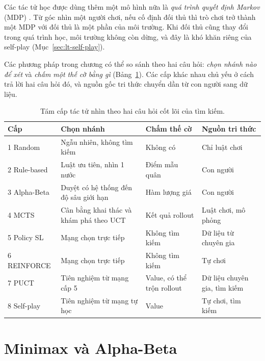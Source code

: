 Các tác tử học được dùng thêm một mô hình nữa là \emph{quá trình quyết định Markov} (MDP) \cite{sutton2018rl}. Từ góc nhìn một người chơi, nếu cố định đối thủ thì trò chơi trở thành một MDP với đối thủ là một phần của môi trường. Khi đối thủ cũng thay đổi trong quá trình học, môi trường không còn dừng, và đây là khó khăn riêng của self-play (Mục~\ref{sec:lt-self-play}).

Các phương pháp trong chương có thể so sánh theo hai câu hỏi: \emph{chọn nhánh nào để xét} và \emph{chấm một thế cờ bằng gì} (Bảng~\ref{tab:lt-tong-quan}). Các cấp khác nhau chủ yếu ở cách trả lời hai câu hỏi đó, và nguồn gốc tri thức chuyển dần từ con người sang dữ liệu.

\begin{table}[!htb]
  \centering\small
  \caption{Tám cấp tác tử nhìn theo hai câu hỏi cốt lõi của tìm kiếm.}
  \label{tab:lt-tong-quan}
  \begin{tabularx}{\textwidth}{@{}l >{\raggedright\arraybackslash}X >{\raggedright\arraybackslash}X >{\raggedright\arraybackslash}X@{}}
    \toprule
    \textbf{Cấp} & \textbf{Chọn nhánh} & \textbf{Chấm thế cờ} & \textbf{Nguồn tri thức} \\
    \midrule
    1 Random & Ngẫu nhiên, không tìm kiếm & Không có & Chỉ luật chơi \\
    2 Rule-based & Luật ưu tiên, nhìn 1 nước & Điểm mẫu quân & Con người \\
    3 Alpha-Beta & Duyệt có hệ thống đến độ sâu giới hạn & Hàm lượng giá & Con người \\
    4 MCTS & Cân bằng khai thác và khám phá theo UCT & Kết quả rollout & Luật chơi, mô phỏng \\
    5 Policy SL & Mạng chọn trực tiếp & Không tìm kiếm & Dữ liệu từ chuyên gia \\
    6 REINFORCE & Mạng chọn trực tiếp & Không tìm kiếm & Tự chơi \\
    7 PUCT & Tiên nghiệm từ mạng cấp 5 & Value, có thể trộn rollout & Dữ liệu chuyên gia, tìm kiếm \\
    8 Self-play & Tiên nghiệm từ mạng tự học & Value & Tự chơi, tìm kiếm \\
    \bottomrule
  \end{tabularx}
\end{table}

\section{Minimax và Alpha-Beta}
\label{sec:lt-minimax}

